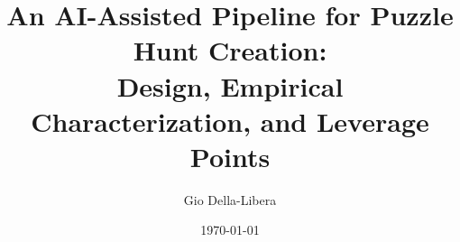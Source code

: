 \documentclass{article}
\title{An AI-Assisted Pipeline for Puzzle Hunt Creation:\\
Design, Empirical Characterization, and Leverage Points}
\author{Gio Della-Libera}
\date{\today}
\begin{document}
\maketitle

\begin{abstract}

\end{abstract}










\end{document}
